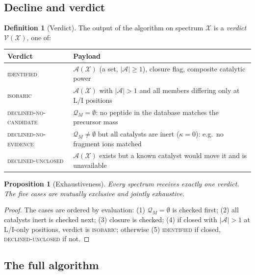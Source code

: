 \documentclass[11pt,a4paper]{article}
\newtheorem{proposition}[theorem]{Proposition}
\theoremstyle{definition}
\newtheorem{definition}[theorem]{Definition}
\theoremstyle{remark}
\newcommand{\amb}{\mathcal{A}}
\newcommand{\Pep}{\mathcal{Q}}
\newcommand{\Spec}{\mathcal{X}}
\newcommand{\pot}{\kappa}
\begin{document}
\subsection{Decline and verdict}

\begin{definition}[Verdict]
\label{def:verdict}
The output of the algorithm on spectrum $\Spec$ is a \emph{verdict}
$\mathcal{V}(\Spec)$, one of:
\begin{center}
\begin{tabular}{@{}lp{}@{}}
\toprule
\textbf{Verdict} & \textbf{Payload} \\
\midrule
\textsc{identified} & $\amb(\Spec)$ (a set, $|\amb|\ge1$), closure
flag, composite catalytic power \\
\textsc{isobaric} & $\amb(\Spec)$ with $|\amb|>1$ and all members
differing only at L/I positions \\
\textsc{declined-no-candidate} & $\Pep_M=\emptyset$: no peptide in
the database matches the precursor mass \\
\textsc{declined-no-evidence} & $\Pep_M\neq\emptyset$ but all
catalysts are inert ($\pot=0$): e.g.\ no fragment ions matched \\
\textsc{declined-unclosed} & $\amb(\Spec)$ exists but a known catalyst
would move it and is unavailable \\
\bottomrule
\end{tabular}
\end{center}
\end{definition}

\begin{proposition}[Exhaustiveness]
\label{prop:exhaust}
Every spectrum receives exactly one verdict. The five cases are
mutually exclusive and jointly exhaustive.
\end{proposition}

\begin{proof}
The cases are ordered by evaluation: (1) $\Pep_M=\emptyset$ is checked
first; (2) all catalysts inert is checked next; (3) closure is checked;
(4) if closed with $|\amb|>1$ at L/I-only positions, verdict is
\textsc{isobaric}; otherwise (5) \textsc{identified} if closed,
\textsc{declined-unclosed} if not.
\end{proof}

\subsection{The full algorithm}
\end{document}

